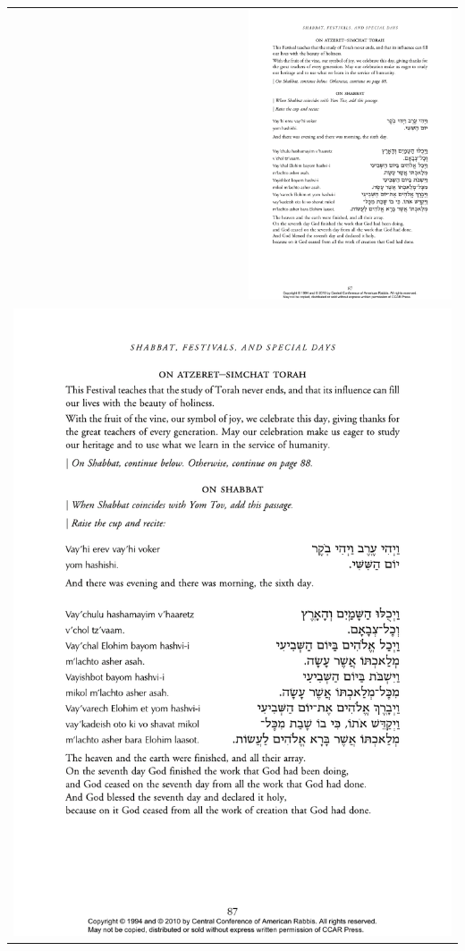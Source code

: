 \documentclass[a4paper,12pt,openany]{memoir}
\begin{document}
\begin{tabular}{r}
\includegraphics[width=6cm]{figs/0A010-vayehi}\\
\includegraphics[scale=1.5,trim=0mm 0mm 2mm 0mm,clip]{figs/0A014-vayechulu}\\
\end{tabular}
\end{document}
